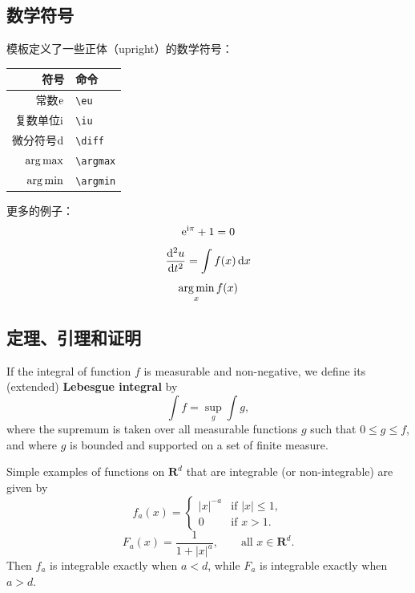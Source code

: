 \subsection{数学符号}

模板定义了一些正体（upright）的数学符号：
\begin{center}
  \begin{tabular}{rl}
    \toprule
    符号                 & 命令 \\
    \midrule
    常数$\mathrm{e}$     & \verb|\eu| \\
    复数单位$\mathrm{i}$ & \verb|\iu| \\
    微分符号$\mathop{}\!\mathrm{d}$ & \verb|\diff| \\
    $\operatorname*{arg\,max}$         & \verb|\argmax| \\
    $\operatorname*{arg\,min}$         & \verb|\argmin| \\
    \bottomrule
  \end{tabular}
\end{center}

更多的例子：
\begin{equation}
\mathrm{e}^{\mathrm{i}\pi} + 1 = 0
\end{equation}
\begin{equation}
\frac{\mathop{}\!\mathrm{d}^2u}{\mathop{}\!\mathrm{d} t^2} = \int f(x) \mathop{}\!\mathrm{d} x
\end{equation}
\begin{equation}
\operatorname*{arg\,min}_x f(x)
\end{equation}

\subsection{定理、引理和证明}

\begin{definition}
  If the integral of function $f$ is measurable and non-negative, we define
  its (extended) \textbf{Lebesgue integral} by
  \begin{equation}
  \int f = \sup_g \int g,
  \end{equation}
  where the supremum is taken over all measurable functions $g$ such that
  $0 \leq g \leq f$, and where $g$ is bounded and supported on a set of
  finite measure.
\end{definition}

\begin{example}
  Simple examples of functions on $\mathbf{R}^d$ that are integrable
  (or non-integrable) are given by
  \begin{equation}
  f_a(x) =
  \begin{cases}
  |x|^{-a} & \text{if } |x| \leq 1,\\
  0 & \text{if } x > 1.
  \end{cases}
  \end{equation}
  \begin{equation}
  F_a(x) = \frac{1}{1 + |x|^a}, \qquad \text{all } x \in \mathbf{R}^d.
  \end{equation}
  Then $f_a$ is integrable exactly when $a < d$, while $F_a$ is integrable
  exactly when $a > d$.
\end{example}

